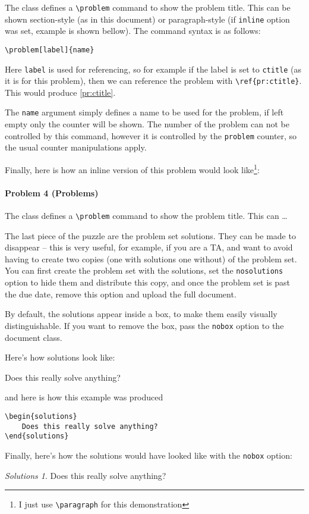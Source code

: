 \documentclass[letterpaper,11pt]{pset}
\theoremstyle{remark}
\newtheorem*{solutionsa}{Solutions}
\begin{document}
The class defines a \texttt{\textbackslash{}problem} command to show the problem title. This can be shown section-style (as in this document) or paragraph-style (if \texttt{inline} option was set, example is shown bellow). The command syntax is as follows:
\begin{verbatim}
\problem[label]{name}
\end{verbatim}
Here \texttt{label} is used for referencing, so for example if the label is set to \texttt{ctitle} (as it is for this problem), then we can reference the problem with \texttt{\textbackslash{}ref\{pr:ctitle\}}. This would produce \ref{pr:ctitle}. 

The \texttt{name} argument simply defines a name to be used for the problem, if left empty only the counter will be shown. The number of the problem can not be controlled by this command, however it is controlled by the \texttt{problem} counter, so the usual counter manipulations apply.

Finally, here is how an inline version of this problem would look like\footnote{I just use \texttt{\textbackslash{}paragraph} for this demonstration}:

\paragraph{Problem 4 (Problems)}
The class defines a \texttt{\textbackslash{}problem} command to show the problem title. This can \ldots


The last piece of the puzzle are the problem set solutions. They can be made to disappear -- this is very useful, for example, if you are a TA, and want to avoid having to create two copies (one with solutions one without) of the problem set. You can first create the problem set with the solutions, set the \texttt{nosolutions} option to hide them and distribute this copy, and once the problem set is past the due date, remove this option and upload the full document.

By default, the solutions appear inside a box, to make them easily visually distinguishable. If you want to remove the box, pass the \texttt{nobox} option to the document class.

Here's how solutions look like:
\begin{solutions}
Does this really solve anything?
\end{solutions}

and here is how this example was produced
\begin{verbatim}
\begin{solutions}
    Does this really solve anything?
\end{solutions}
\end{verbatim}
Finally, here's how the solutions would have looked like with the \texttt{nobox} option:
\begin{solutionsa}
Does this really solve anything?
\end{solutionsa}
\end{document}
